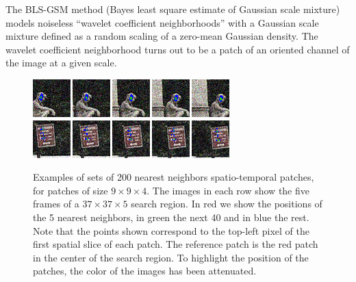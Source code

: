 \documentclass[10pt, journal, twocolumn, final, a4paper]{IEEEtran}
\begin{document}
The BLS-GSM method \cite{Portilla2003} (Bayes least square estimate of Gaussian
scale mixture) models noiseless ``wavelet coefficient neighborhoods'' with a
Gaussian scale mixture defined as a random scaling of a zero-mean Gaussian
density. The wavelet coefficient neighborhood turns out to be a patch of an
oriented channel of the image at a given scale.




\begin{figure}[htpb!]
	\centering
	\includegraphics[width = .8\textwidth]{figs/patch_groups/patch_group_bus_045_085_012_s40_wx37_wt2_sx9_st4_r040_n200_coor.png}\\
	\vspace{.2cm}
	\includegraphics[width = .8\textwidth]{figs/patch_groups/patch_group_bus_255_056_010_s40_wx37_wt2_sx9_st4_r040_n200_coor.png}
	\caption{Examples of sets of 200 nearest neighbors spatio-temporal patches,
	for patches of size $9\times 9\times 4$.
	The images in each row show the five frames of a $37\times37\times5$ search region. 
	In red we show the positions of the 5 nearest neighbors, in green the next 40 and in blue the rest.
	Note that the points shown correspond to the top-left pixel of the first spatial
	slice of each patch.
	The reference patch is the red patch in the center of the search region. To highlight the
	position of the patches, the color of the images has been attenuated.}
	\label{fig:patch_groups_pos}
\end{figure}
\end{document}
